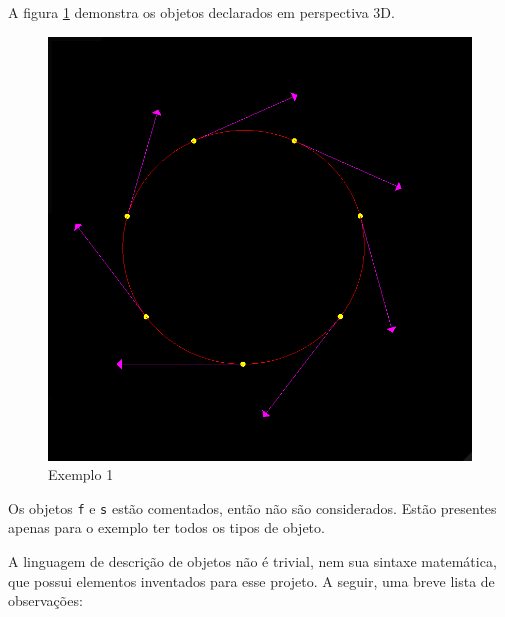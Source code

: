 A figura \ref{img:ex1} demonstra os objetos declarados em perspectiva 3D.
\begin{figure}[!ht]
    \includegraphics[width=\linewidth]{ex1.png}
    \caption{Exemplo 1}
    \label{img:ex1}
\end{figure}

Os objetos \texttt{f} e \texttt{s} estão comentados, então não são considerados.
Estão presentes apenas para o exemplo ter todos os tipos de objeto.

A linguagem de descrição de objetos não é trivial, nem sua sintaxe matemática,
que possui elementos inventados para esse projeto.
A seguir, uma breve lista de observações:

